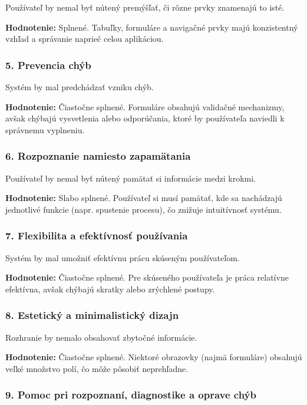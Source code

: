 Používateľ by nemal byť nútený premýšľať, či rôzne prvky znamenajú to isté.

\textbf{Hodnotenie:} Splnené.  
Tabuľky, formuláre a navigačné prvky majú konzistentný vzhľad a správanie naprieč celou aplikáciou.

\subsubsection*{5. Prevencia chýb}

Systém by mal predchádzať vzniku chýb.

\textbf{Hodnotenie:} Čiastočne splnené.  
Formuláre obsahujú validačné mechanizmy, avšak chýbajú vysvetlenia alebo odporúčania, ktoré by používateľa naviedli k správnemu vyplneniu.

\subsubsection*{6. Rozpoznanie namiesto zapamätania}

Používateľ by nemal byť nútený pamätať si informácie medzi krokmi.

\textbf{Hodnotenie:} Slabo splnené.  
Používateľ si musí pamätať, kde sa nachádzajú jednotlivé funkcie (napr. spustenie procesu), čo znižuje intuitívnosť systému.

\subsubsection*{7. Flexibilita a efektívnosť používania}

Systém by mal umožniť efektívnu prácu skúseným používateľom.

\textbf{Hodnotenie:} Čiastočne splnené.  
Pre skúseného používateľa je práca relatívne efektívna, avšak chýbajú skratky alebo zrýchlené postupy.

\subsubsection*{8. Estetický a minimalistický dizajn}

Rozhranie by nemalo obsahovať zbytočné informácie.

\textbf{Hodnotenie:} Čiastočne splnené.  
Niektoré obrazovky (najmä formuláre) obsahujú veľké množstvo polí, čo môže pôsobiť neprehľadne.

\subsubsection*{9. Pomoc pri rozpoznaní, diagnostike a oprave chýb}

